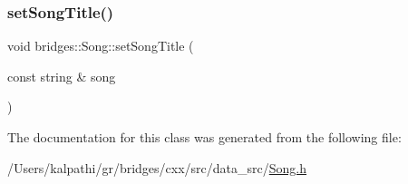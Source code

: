 \subsubsection{\texorpdfstring{setSongTitle()}{setSongTitle()}}
{\footnotesize\ttfamily void bridges\+::\+Song\+::set\+Song\+Title (\begin{DoxyParamCaption}\item[{const string \&}]{song }\end{DoxyParamCaption})\hspace{0.3cm}{\ttfamily [inline]}}



The documentation for this class was generated from the following file\+:\begin{DoxyCompactItemize}
\item 
/\+Users/kalpathi/gr/bridges/cxx/src/data\+\_\+src/\mbox{\hyperlink{_song_8h}{Song.\+h}}\end{DoxyCompactItemize}

